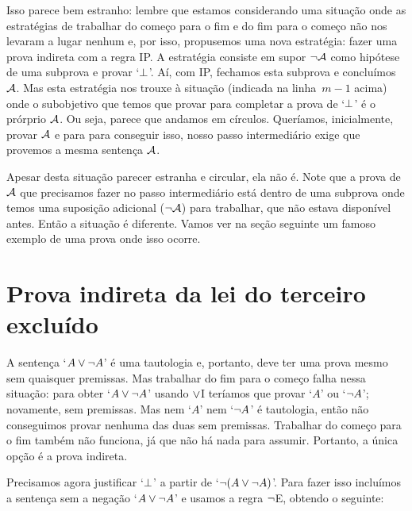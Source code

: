 Isso parece bem estranho: lembre que estamos considerando uma situação onde as estratégias de trabalhar do começo para o fim e do fim para o começo não nos levaram a lugar nenhum e, por isso, propusemos uma nova estratégia: fazer uma prova indireta com a regra IP. A estratégia consiste em supor $\neg \mathcal{A}$ como hipótese de uma subprova e provar `$\bot$'. Aí, com IP, fechamos esta subprova e concluímos $\mathcal{A}$. Mas esta estratégia nos trouxe à situação (indicada na linha~$m - 1$ acima) onde o subobjetivo que temos que provar para completar a prova de `$\bot$' é o prórprio $\mathcal{A}$. Ou seja, parece que andamos em círculos. Queríamos, inicialmente, provar $\mathcal{A}$ e para para conseguir isso, nosso passo intermediário exige que provemos a mesma sentença $\mathcal{A}$.

Apesar desta situação parecer estranha e circular, ela não é. Note que a prova de $\mathcal{A}$ que precisamos fazer no passo intermediário está dentro de uma subprova onde temos uma suposição adicional ($\neg \mathcal{A}$) para trabalhar, que não estava disponível antes. Então a situação é diferente. Vamos ver na seção seguinte um famoso exemplo de uma prova onde isso ocorre.

 


\section{Prova indireta da lei do terceiro excluído}\label{s:proofLEM}

A sentença `$A \vee \neg A$' é uma tautologia e, portanto, deve ter uma prova mesmo sem quaisquer premissas. Mas trabalhar do fim para o começo falha nessa situação: para obter `$A \vee \neg A$' usando $\vee$I teríamos que provar `$A$' ou `$\neg A$'; novamente, sem premissas. Mas nem `$A$' nem  `$\neg A$' é tautologia, então não conseguimos provar nenhuma das duas sem premissas. Trabalhar  do começo para o fim também não funciona, já que não há nada para assumir. Portanto, a única opção é a prova indireta.
\begin{fitchproof}
	\open
	\ellipsesline
	\close
\end{fitchproof}

Precisamos agora justificar `$\bot$' a partir de `$\neg(A \vee \neg A)$'. Para fazer isso incluímos a sentença sem a negação   `$A \vee\neg A$' e usamos a regra  $\neg$E, obtendo o seguinte:
\begin{fitchproof}
	\open
	\ellipsesline
	\close
\end{fitchproof}

